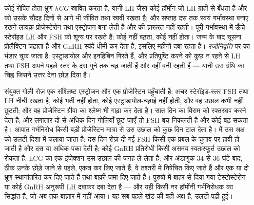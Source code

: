 \begin{proposition}[गर्भावस्था, स्तनपायन, रजोनिवृत्ति]\label{prop:b2:reproductive-hormones:overrides}
कोई रोपित होता भ्रूण \emph{hCG} स्रावित करता है, यानी LH जैसा कोई
हॉर्मोन जो LH ग्राही से बँधता है और  को उसके चौदह दिनों
से आगे भी जीवित तथा स्रावी रखता है; और सप्ताह दस तक  स्वयं
गर्भावस्था बनाए रखने लायक़ प्रोजेस्टेरोन तथा एस्ट्रोजन बना लेती है
और  की ज़रूरत नहीं रहती। पूरी गर्भावस्था में ऊँचे
स्टेरॉइड LH और FSH को शून्य पर रखते हैं: कोई  नहीं बढ़ता, कोई
 नहीं होता। जन्म के बाद चूसना प्रोलैक्टिन चढ़ाता है और GnRH
स्पंदें धीमी कर देता है, इसलिए  महीनों दबा रहता है।
\emph{रजोनिवृत्ति} पर  का भंडार चुक जाता है: एस्ट्राडायोल और
इनहिबिन गिरते हैं, और प्रतिपुष्टि करने को कुछ न रहने से LH तथा FSH
अपने पहले स्तर के दस गुने तक चढ़ जाती हैं और वहीं बनी रहती हैं --- यानी
उस ग्रंथि का चिह्न जिसने उत्तर देना छोड़ दिया है।
\end{proposition}

\begin{proposition}[गर्भनिरोध और सहायित जनन]\label{prop:b2:reproductive-hormones:clinic}
संयुक्त गोली रोज़ एक संश्लिष्ट एस्ट्रोजन और एक प्रोजेस्टिन पहुँचाती है:
अचर स्टेरॉइड-स्तर FSH तथा LH नीची रखता है, कोई
 भर्ती नहीं होता, कोई एस्ट्राडायोल-चढ़ाई नहीं होती, और वह उछाल
कभी नहीं छूटती; और वह प्रोजेस्टिन ग्रीवा का श्लेष्म भी गाढ़ा कर देता है।
सात दिन का विराम  को रक्तस्राव करने देता है; और
लगातार दो से अधिक दिन गोलियाँ छूट जाएँ तो FSH बच निकलती है और कोई
 बढ़ सकता है। आपात गर्भनिरोध किसी बड़ी प्रोजेस्टिन मात्रा से उस
उछाल को कुछ दिन टाल देता है। \emph{} में उस अक्ष को
उलटी दिशा में चलाया जाता है: दस दिन रोज़ दी गई FSH किसी एक प्रबल
 के चुनाव पर हावी हो जाती है और दस या अधिक पका देती है; कोई
GnRH प्रतिरोधी किसी असमय स्वतःस्फूर्त उछाल को रोकता है; hCG का एक
इंजेक्शन उस उछाल की जगह ले लेता है, और अंडाणुक 34 से 36 घंटे बाद, ठीक
उनके छोड़े जाने से पहले, एकत्र कर लिए जाते हैं; वे तश्तरी में निषेचित
किए जाते हैं और एक या दो भ्रूण स्थानांतरित कर दिए जाते हैं तथा
बाक़ी जमा दिए जाते हैं। पुरुषों में बाहर से दिया गया टेस्टोस्टेरोन या
कोई GnRH अनुरूपी LH दबाकर  दबा देता है --- और यही किसी
नर हॉर्मोनी गर्भनिरोधक का सिद्धांत है, जो अब तक बाज़ार में नहीं आया।
यह सब पहले खंड की वही अक्ष है, उलटी पढ़ी हुई।
\end{proposition}

